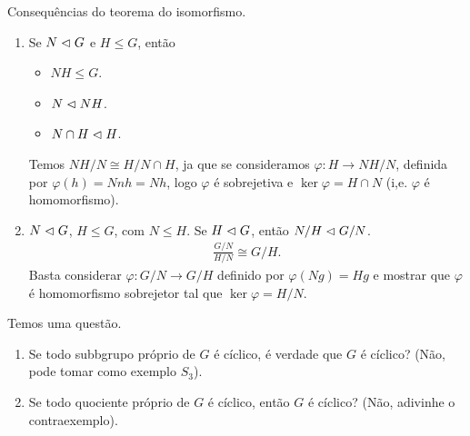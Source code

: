 Consequências do teorema do isomorfismo.
\begin{enumerate}
  \item Se $N\vartriangleleft G$ e $H\leq G$, então
    \begin{itemize}
      \item $NH\leq G$.
      \item $N\vartriangleleft NH$.
      \item $N\cap H\vartriangleleft H$.
    \end{itemize}
    \begin{center}
      
    \end{center}
    Temos $NH/N\cong H/N\cap H$, ja que se consideramos $\varphi:H\to NH/N$, definida por $\varphi(h)=Nnh=Nh$, logo $\varphi$ é sobrejetiva e $\ker\varphi=H\cap N$ (i,e. $\varphi$ é homomorfismo).
  \item $N\vartriangleleft G$, $H\leq G$, com $N\leq H$. Se $H\vartriangleleft G$, então $N/H\vartriangleleft G/N$.
    \begin{align*}
      \frac{G/N}{H/N}\cong G/H.
    \end{align*}
    Basta considerar $\varphi:G/N\to G/H$ definido por $\varphi(Ng)=Hg$ e mostrar que $\varphi$ é homomorfismo sobrejetor tal que $\ker\varphi=H/N$. 
\end{enumerate}
Temos uma questão.
\begin{enumerate}
  \item Se todo subbgrupo próprio de $G$ é cíclico, é verdade que $G$ é cíclico? (Não, pode tomar como exemplo $S_3$).
  \item Se todo quociente próprio de $G$ é cíclico, então $G$ é cíclico? (Não, adivinhe o contraexemplo). 
\end{enumerate}

